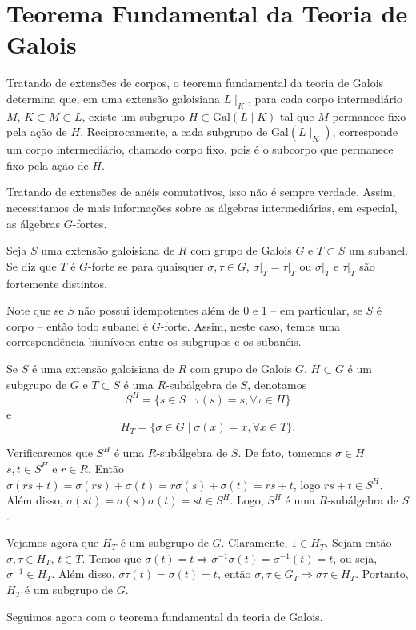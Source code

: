 \section{Teorema Fundamental da Teoria de Galois} \label{sec:teofund}
Tratando de extensões de corpos, o teorema fundamental da teoria de Galois determina que, em uma extensão galoisiana $L\mid_K$, para cada corpo intermediário $M$, $K \subset M \subset L$, existe um subgrupo $H \subset \textrm{Gal}(L\mid K)$ tal que $M$ permanece fixo pela ação de $H$. Reciprocamente, a cada subgrupo de $\textrm{Gal}(L\mid_K)$, corresponde um corpo intermediário, chamado corpo fixo, pois é o subcorpo que permanece fixo pela ação de $H$. \par Tratando de extensões de anéis comutativos, isso não é sempre verdade. Assim, necessitamos de mais informações sobre as álgebras intermediárias, em especial, as álgebras $G$-fortes.

\begin{defn}
Seja $S$ uma extensão galoisiana de $R$ com grupo de Galois $G$ e $T \subset S$ um subanel. Se diz que $T$ é $G$-forte se para quaisquer $\sigma,\tau \in G$, $\left.\sigma\right|_T = \left.\tau\right|_T$ ou $\left. \sigma \right|_T$ e $\left. \tau \right|_T$ são fortemente distintos.
\end{defn}
Note que se $S$ não possui idempotentes além de 0 e 1 -- em particular, se $S$ é corpo -- então todo subanel é $G$-forte. Assim, neste caso, temos uma correspondência biunívoca entre os subgrupos e os subanéis. \par 
Se $S$ é uma extensão galoisiana de $R$ com grupo de Galois $G$, $H\subset G$ é um subgrupo de $G$ e $T\subset S$ é uma $R$-subálgebra de $S$, denotamos \[S^H=\{s\in S \mid \tau(s)=s, \forall \tau \in H\}\] e \[H_T=\{ \sigma\in G \mid \sigma(x)=x, \forall x \in T \}.\] \par
Verificaremos que $S^H$ é uma $R$-subálgebra de $S$. De fato, tomemos $\sigma \in H$ $s,t \in S^H$ e $r \in R$. Então $\sigma(rs+t)= \sigma(rs)+\sigma(t)= r\sigma(s)+\sigma(t)= rs+t$, logo $rs+t \in S^H$. Além disso, $\sigma(st)=\sigma(s)\sigma(t) =st \in S^H$. Logo, $S^H$ é uma $R$-subálgebra de $S$. \par
Vejamos agora que $H_T$ é um subgrupo de $G$. Claramente, $1 \in H_T$. Sejam então $\sigma, \tau \in H_T$, $t \in T$. Temos que $\sigma(t)=t \Rightarrow \sigma^{-1}\sigma(t)=\sigma^{-1}(t) =t$, ou seja, $\sigma^{-1}\in H_T$. Além disso, $\sigma\tau(t)=\sigma(t)=t$, então $\sigma, \tau \in G_T \Rightarrow \sigma\tau \in H_T$. Portanto, $H_T$ é um subgrupo de $G$. \par
Seguimos agora com o teorema fundamental da teoria de Galois.


